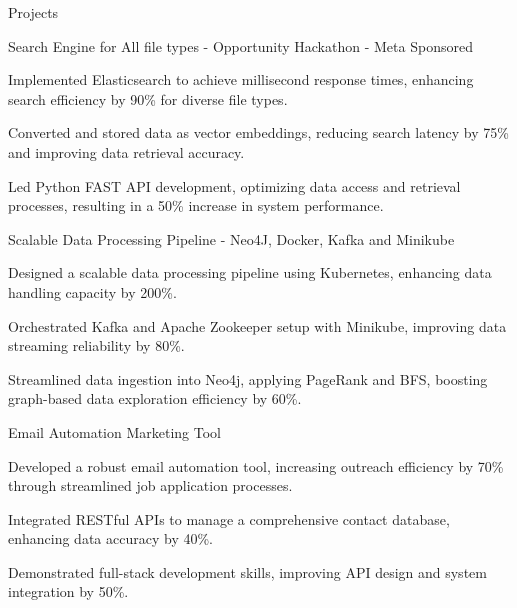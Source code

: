 \documentclass{resume} %
\begin{document}
    \begin{rSection}{Projects}
                    \begin{rSubsection}
                                    {Search Engine for All file types {-} Opportunity Hackathon {-} Meta Sponsored}
                                {\normalfont{ - }}{}{}
                                    \item Implemented Elasticsearch to achieve millisecond response times, enhancing search efficiency by 90\% for diverse file types.
                                    \item Converted and stored data as vector embeddings, reducing search latency by 75\% and improving data retrieval accuracy.
                                    \item Led Python FAST API development, optimizing data access and retrieval processes, resulting in a 50\% increase in system performance.
                            \end{rSubsection}
                    \begin{rSubsection}
                                    {Scalable Data Processing Pipeline {-} Neo4J, Docker, Kafka and Minikube}
                                {\normalfont{ - }}{}{}
                                    \item Designed a scalable data processing pipeline using Kubernetes, enhancing data handling capacity by 200\%.
                                    \item Orchestrated Kafka and Apache Zookeeper setup with Minikube, improving data streaming reliability by 80\%.
                                    \item Streamlined data ingestion into Neo4j, applying PageRank and BFS, boosting graph{-}based data exploration efficiency by 60\%.
                            \end{rSubsection}
                    \begin{rSubsection}
                                    {Email Automation Marketing Tool}
                                {\normalfont{ - }}{}{}
                                    \item Developed a robust email automation tool, increasing outreach efficiency by 70\% through streamlined job application processes.
                                    \item Integrated RESTful APIs to manage a comprehensive contact database, enhancing data accuracy by 40\%.
                                    \item Demonstrated full{-}stack development skills, improving API design and system integration by 50\%.
                            \end{rSubsection}
            \end{rSection}
\end{document}

